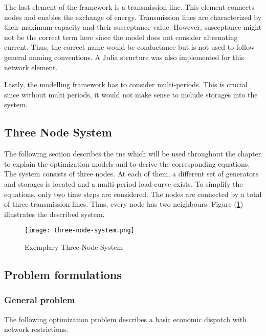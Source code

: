 The last element of the framework is a transmission line. This element connects nodes and enables the exchange of energy. Transmission lines are characterized by their maximum capacity and their susceptance value. However, susceptance might not be the correct term here since the model does not consider alternating current. Thus, the correct name would be conductance but is not used to follow general naming conventions. A Julia structure was also implemented for this network element.

Lastly, the modelling framework has to consider multi-periods. This is crucial since without multi periods, it would not make sense to include storages into the system.

 
\subsection{Three Node System}

The following section describes the \gls{tns} which will be used throughout the chapter to explain the optimization models and to derive the corresponding equations. The system consists of three nodes. At each of them, a different set of generators and storages is located and a multi-period load curve exists. To simplify the equations, only two time steps are considered. The nodes are connected by a total of three transmission lines. Thus, every node has two neighbours. Figure (\ref{fig:tns}) illustrates the described system.

\begin{figure}[h]
	\centering
	\texttt{[image: three-node-system.png]}
	\caption{Exemplary Three Node System}
	\label{fig:tns}
\end{figure}

\subsection{Problem formulations}

\subsubsection{General problem}
\label{sec:general_formulation}

The following optimization problem describes a basic economic dispatch with network restrictions.

